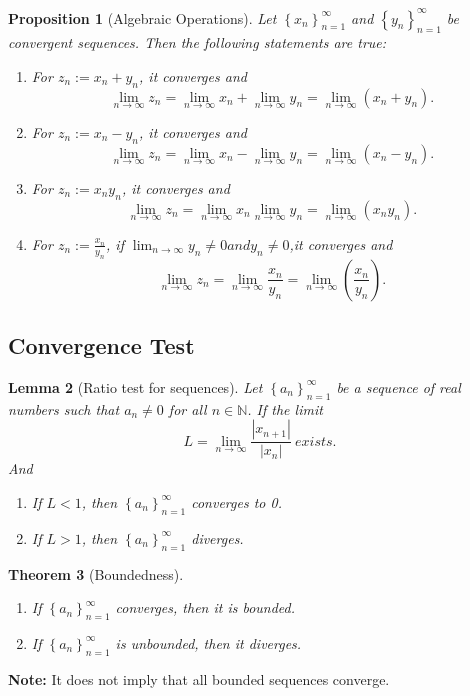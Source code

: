\documentclass{article}
\newtheorem{theorem}{Theorem}[section]
\newtheorem{lemma}[theorem]{Lemma}
\newtheorem{prop}[theorem]{Proposition}
\theoremstyle{definition}
\begin{document}
\begin{prop}[Algebraic Operations]

    Let $\left\{x_{n}\right\}_{n=1}^{\infty}$ and $\left\{y_{n}\right\}_{n=1}^{\infty}$ be convergent sequences. Then the following statements are true:
\begin{enumerate}
    \item For $z_{n}:=x_{n}+y_{n}$, it converges and $$\lim_{n\rightarrow \infty}z_{n}=\lim_{n\rightarrow \infty}x_{n}+\lim_{n\rightarrow \infty}y_{n}=\lim_{n\rightarrow \infty}(x_{n}+y_{n}).$$
    \item For $z_{n}:=x_{n}-y_{n}$, it converges and $$\lim_{n\rightarrow \infty}z_{n}=\lim_{n\rightarrow \infty}x_{n}-\lim_{n\rightarrow \infty}y_{n}=\lim_{n\rightarrow \infty}(x_{n}-y_{n}).$$
    \item For $z_{n}:=x_{n}y_{n}$, it converges and $$\lim_{n\rightarrow \infty}z_{n}=\lim_{n\rightarrow \infty}x_{n}\lim_{n\rightarrow \infty}y_{n}=\lim_{n\rightarrow \infty}(x_{n}y_{n}).$$
    \item For $z_{n}:=\frac{x_{n}}{y_{n}}$, if $\lim_{n\to \infty} y_{n}\neq 0 and y_{n}\neq 0$,it converges and $$\lim_{n\rightarrow \infty}z_{n}=\lim_{n\rightarrow \infty}\frac{x_{n}}{y_{n}}=\lim_{n\rightarrow \infty}\left(\frac{x_{n}}{y_{n}}\right).$$
\end{enumerate}
\end{prop}


\subsection{Convergence Test}
\begin{lemma}[Ratio test for sequences]
    Let $\left\{a_{n}\right\}_{n=1}^{\infty}$ be a sequence of real numbers such that $a_{n}\neq 0$ for all $n\in \mathbb{N}$. If the limit 
    $$L=\lim_{n\to \infty}\frac{|x_{n+1}|}{|x_{n}|}\ exists.$$
    And 
    \begin{enumerate}
        \item If $L<1$, then $\left\{a_{n}\right\}_{n=1}^{\infty}$ converges to 0.
        \item If $L>1$, then $\left\{a_{n}\right\}_{n=1}^{\infty}$ diverges.
    \end{enumerate}
\end{lemma}

\begin{theorem}[Boundedness]
    \begin{enumerate}
        \item If $\left\{a_{n}\right\}_{n=1}^{\infty}$ converges, then it is bounded.
        \item If $\left\{a_{n}\right\}_{n=1}^{\infty}$ is unbounded, then it diverges.
    \end{enumerate}
\end{theorem}
\noindent\textbf{Note:} It does not imply that all bounded sequences converge. 
\end{document}
